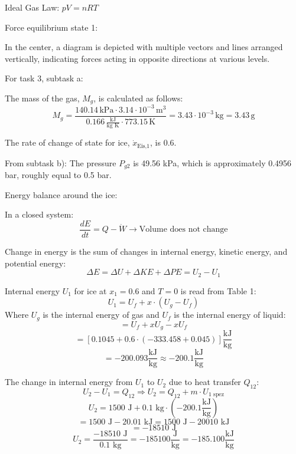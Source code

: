 Ideal Gas Law: \( pV = nRT \)

Force equilibrium state 1:

In the center, a diagram is depicted with multiple vectors and lines arranged vertically, indicating forces acting in opposite directions at various levels.

For task 3, subtask a:

The mass of the gas, \( M_g \), is calculated as follows:
\[ 
M_g = \frac{140.14 \, \text{kPa} \cdot 3.14 \cdot 10^{-3} \, \text{m}^3}{0.166 \, \frac{\text{kJ}}{\text{kg K}} \cdot 773.15 \, \text{K}} = 3.43 \cdot 10^{-3} \, \text{kg} = 3.43 \, \text{g}
\]

The rate of change of state for ice, \( \dot{x}_{\text{Eis,1}} \), is 0.6.

From subtask b): The pressure \( P_{g2} \) is 49.56 kPa, which is approximately 0.4956 bar, roughly equal to 0.5 bar.

Energy balance around the ice:

In a closed system:
\[ 
\frac{dE}{dt} = Q - \dot{W} \rightarrow \text{Volume does not change}
\]

Change in energy is the sum of changes in internal energy, kinetic energy, and potential energy:
\[ 
\Delta E = \Delta U + \Delta KE + \Delta PE = U_2 - U_1
\]

Internal energy \( U_1 \) for ice at \( x_1 = 0.6 \) and \( T=0 \) is read from Table 1:
\[ 
U_1 = U_f + x \cdot (U_g - U_f)
\]
Where \( U_g \) is the internal energy of gas and \( U_f \) is the internal energy of liquid:
\[ 
= U_f + x U_g - x U_f
\]
\[ 
= [0.1045 + 0.6 \cdot (-333.458 + 0.045)] \frac{\text{kJ}}{\text{kg}}
\]
\[ 
= -200.093 \frac{\text{kJ}}{\text{kg}} \approx -200.1 \frac{\text{kJ}}{\text{kg}}
\]

The change in internal energy from \( U_1 \) to \( U_2 \) due to heat transfer \( Q_{12} \):
\[ 
U_2 - U_1 = Q_{12} \Rightarrow U_2 = Q_{12} + m \cdot U_{\text{1 spez}}
\]
\[ 
U_2 = 1500 \text{ J} + 0.1 \text{ kg} \cdot (-200.1 \frac{\text{kJ}}{\text{kg}})
\]
\[ 
= 1500 \text{ J} - 20.01 \text{ kJ} = 1500 \text{ J} - 20010 \text{ kJ}
\]
\[ 
= -18510 \text{ J}
\]
\[ 
U_2 = \frac{-18510 \text{ J}}{0.1 \text{ kg}} = -185100 \frac{\text{J}}{\text{kg}} = -185.100 \frac{\text{kJ}}{\text{kg}}
\]